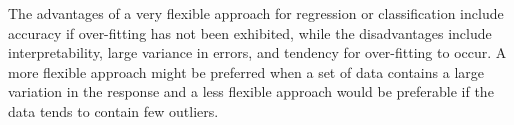 
The advantages of a very flexible approach for regression or classification 
include accuracy if over-fitting has not been exhibited, while the disadvantages 
include interpretability, large variance in errors, and tendency for over-fitting to
occur. A more flexible approach might be preferred when a set of data contains
a large variation in the response and a less flexible approach would be 
preferable if the data tends to contain few outliers.\par
